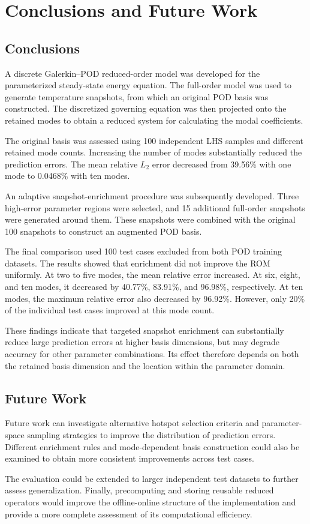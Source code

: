\section{Conclusions and Future Work}
\label{sec:conclusions}

\subsection{Conclusions}

A discrete Galerkin--POD reduced-order model was developed
for the parameterized steady-state energy equation. The
full-order model was used to generate temperature
snapshots, from which an original POD basis was
constructed. The discretized governing equation was
then projected onto the retained modes to obtain a
reduced system for calculating the modal coefficients.

The original basis was assessed using 100 independent
LHS samples and different retained mode counts.
Increasing the number of modes substantially reduced
the prediction errors. The mean relative $L_2$ error
decreased from 39.56\% with one mode to 0.0468\%
with ten modes.

An adaptive snapshot-enrichment procedure was
subsequently developed. Three high-error parameter
regions were selected, and 15 additional full-order
snapshots were generated around them. These snapshots
were combined with the original 100 snapshots to
construct an augmented POD basis.

The final comparison used 100 test cases excluded
from both POD training datasets. The results showed
that enrichment did not improve the ROM uniformly.
At two to five modes, the mean relative error
increased. At six, eight, and ten modes, it decreased
by 40.77\%, 83.91\%, and 96.98\%, respectively.
At ten modes, the maximum relative error also
decreased by 96.92\%. However, only 20\% of the
individual test cases improved at this mode count.

These findings indicate that targeted snapshot
enrichment can substantially reduce large prediction
errors at higher basis dimensions, but may degrade
accuracy for other parameter combinations. Its
effect therefore depends on both the retained
basis dimension and the location within the
parameter domain.

\subsection{Future Work}

Future work can investigate alternative hotspot
selection criteria and parameter-space sampling
strategies to improve the distribution of prediction
errors. Different enrichment rules and mode-dependent
basis construction could also be examined to obtain
more consistent improvements across test cases.

The evaluation could be extended to larger independent
test datasets to further assess generalization.
Finally, precomputing and storing reusable reduced
operators would improve the offline-online structure
of the implementation and provide a more complete
assessment of its computational efficiency.
